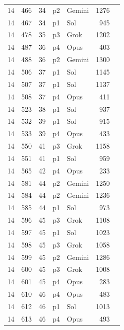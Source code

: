 \begin{longtable}{r r r l l r L{2.2in}}
14 & 466 & 34 & p2 & Gemini & 1276 &  \\
14 & 467 & 34 & p1 & Sol & 945 &  \\
14 & 478 & 35 & p3 & Grok & 1202 &  \\
14 & 487 & 36 & p4 & Opus & 403 &  \\
14 & 488 & 36 & p2 & Gemini & 1300 &  \\
14 & 506 & 37 & p1 & Sol & 1145 &  \\
14 & 507 & 37 & p1 & Sol & 1137 &  \\
14 & 508 & 37 & p4 & Opus & 411 &  \\
14 & 523 & 38 & p1 & Sol & 937 &  \\
14 & 532 & 39 & p1 & Sol & 915 &  \\
14 & 533 & 39 & p4 & Opus & 433 &  \\
14 & 550 & 41 & p3 & Grok & 1158 &  \\
14 & 551 & 41 & p1 & Sol & 959 &  \\
14 & 565 & 42 & p4 & Opus & 233 &  \\
14 & 581 & 44 & p2 & Gemini & 1250 &  \\
14 & 584 & 44 & p2 & Gemini & 1236 &  \\
14 & 585 & 44 & p1 & Sol & 973 &  \\
14 & 596 & 45 & p3 & Grok & 1108 &  \\
14 & 597 & 45 & p1 & Sol & 1023 &  \\
14 & 598 & 45 & p3 & Grok & 1058 &  \\
14 & 599 & 45 & p2 & Gemini & 1286 &  \\
14 & 600 & 45 & p3 & Grok & 1008 &  \\
14 & 601 & 45 & p4 & Opus & 283 &  \\
14 & 610 & 46 & p4 & Opus & 483 &  \\
14 & 612 & 46 & p1 & Sol & 1013 &  \\
14 & 613 & 46 & p4 & Opus & 493 &  \\

\end{longtable}

